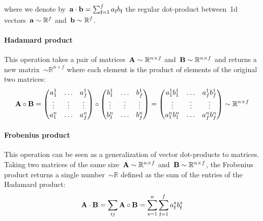 \documentclass{article}
\begin{document}
\begin{appendices}
\noindent where we denote by~${\bf a} \cdot {\bf b} = \sum_{\mathfrak{f}=1}^f a_\mathfrak{f} b_\mathfrak{f}$ the regular dot-product between~1d vectors~${\bf a} \sim \mathbb{R}^f$ and~${\bf b} \sim \mathbb{R}^f$.

\paragraph{Hadamard product}  This operation takes a pair of matrices~${\bf A} \sim \mathbb{R}^{n \times f}$ and~${\bf B} \sim \mathbb{R}^{n\times f}$ and returns a new matrix~$\sim \mathbb{R}^{n\times f}$ where each element is the product of elements of the original two matrices:
\begin{equation}
{\bf A} \circ {\bf B} = \left(
\begin{matrix}
    a^1_1 & \dots &  a^1_f \\
    \vdots & \vdots & \vdots \\
    a^n_1 & \dots &  a^n_f
\end{matrix} \right) \circ \left(
\begin{matrix}
    b^1_1 & \dots &  b^1_f \\
    \vdots & \vdots & \vdots \\
    b^n_1 & \dots &  b^n_f
\end{matrix} \right) = \left(
\begin{matrix}
    a^1_1 b^1_1 & \dots &  a^1_f b^1_f \\
    \vdots & \vdots & \vdots \\
    a^n_1 b^n_1 & \dots &  a^n_f b^n_f
\end{matrix} \right) \sim \mathbb{R}^{n \times f} 
\end{equation}

\paragraph{Frobenius product}  This operation can be seen as a generalization of vector dot-products to matrices.  Taking two matrices of the same size~${\bf A} \sim \mathbb{R}^{n \times f}$ and~${\bf B} \sim \mathbb{R}^{n\times f}$, the Frobenius product returns a single number~$\sim \mathbb{R}$ defined as the sum of the entries of the Hadamard product:
\begin{equation}
{\bf A} \cdot {\bf B} = \sum_{ij} {\bf A} \circ {\bf B} = \sum_{s=1}^n \sum_{\mathfrak{f}=1}^f a^s_\mathfrak{f} b^s_\mathfrak{f}
\end{equation}


\end{appendices}
\end{document}
